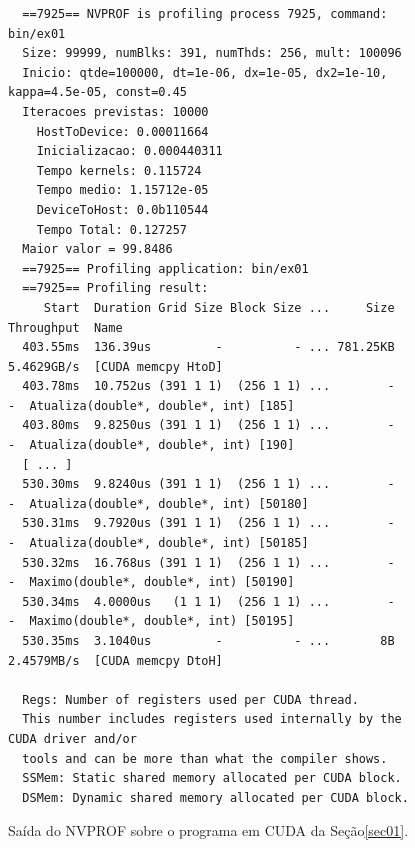 \documentclass[conference]{IEEEtran}
\begin{document}
\begin{figure}
\centering
\begin{adjustbox}{max width=\linewidth}
\begin{BVerbatim}
  ==7925== NVPROF is profiling process 7925, command: bin/ex01
  Size: 99999, numBlks: 391, numThds: 256, mult: 100096
  Inicio: qtde=100000, dt=1e-06, dx=1e-05, dx2=1e-10, kappa=4.5e-05, const=0.45
  Iteracoes previstas: 10000
  	HostToDevice: 0.00011664
  	Inicializacao: 0.000440311
  	Tempo kernels: 0.115724
  	Tempo medio: 1.15712e-05
  	DeviceToHost: 0.0b110544
  	Tempo Total: 0.127257
  Maior valor = 99.8486
  ==7925== Profiling application: bin/ex01
  ==7925== Profiling result:
     Start  Duration Grid Size Block Size ...     Size  Throughput  Name
  403.55ms  136.39us         -          - ... 781.25KB  5.4629GB/s  [CUDA memcpy HtoD]
  403.78ms  10.752us (391 1 1)  (256 1 1) ...        -           -  Atualiza(double*, double*, int) [185]
  403.80ms  9.8250us (391 1 1)  (256 1 1) ...        -           -  Atualiza(double*, double*, int) [190]
  [ ... ]
  530.30ms  9.8240us (391 1 1)  (256 1 1) ...        -           -  Atualiza(double*, double*, int) [50180]
  530.31ms  9.7920us (391 1 1)  (256 1 1) ...        -           -  Atualiza(double*, double*, int) [50185]
  530.32ms  16.768us (391 1 1)  (256 1 1) ...        -           -  Maximo(double*, double*, int) [50190]
  530.34ms  4.0000us   (1 1 1)  (256 1 1) ...        -           -  Maximo(double*, double*, int) [50195]
  530.35ms  3.1040us         -          - ...       8B  2.4579MB/s  [CUDA memcpy DtoH]

  Regs: Number of registers used per CUDA thread.
  This number includes registers used internally by the CUDA driver and/or
  tools and can be more than what the compiler shows.
  SSMem: Static shared memory allocated per CUDA block.
  DSMem: Dynamic shared memory allocated per CUDA block.
\end{BVerbatim}
\end{adjustbox}
\caption{Saída do NVPROF sobre o programa em CUDA da Seção\ref{sec01}.\label{fig:nvprof}}
\end{figure}




%
\end{document}
